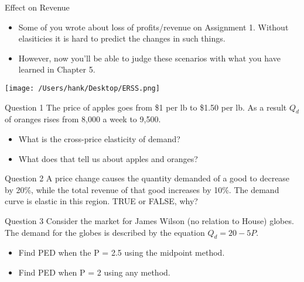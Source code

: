 \documentclass[aspectratio=169]{beamer}
\begin{document}
\begin{frame}{Effect on Revenue}
    \begin{itemize}
        \item Some of you wrote about loss of profits/revenue on Assignment 1. Without elasiticies it is hard to predict the changes in such things.
        \item However, now you'll be able to judge these scenarios with what you have learned in Chapter 5.
    \end{itemize}  
   
    \begin{center}
        \texttt{[image: /Users/hank/Desktop/ERSS.png]}
    \end{center}
\end{frame}

\begin{frame}
    \begin{block}{Question 1}
        The price of apples goes from \$1 per lb to \$1.50 per lb. As a result $Q_d$ of oranges rises from 8,000 a week to 9,500.
        \begin{itemize}
            \item What is the cross-price elasticity of demand?
            \item What does that tell us about apples and oranges?
        \end{itemize}
    \end{block}

    \begin{block}{Question 2}
        A price change causes the quantity demanded of a good to decrease by 20\%, while the total revenue of that good increases by 10\%. The demand curve is elastic in this region. TRUE or FALSE, why?  
    \end{block}

    \begin{block}{Question 3}
        Consider the market for James Wilson (no relation to House) globes. The demand for the globes is described by the equation $ Q_d = 20-5P$. 
        \begin{itemize}
            \item Find PED when the P = 2.5 using the midpoint method.
            \item Find PED when P = 2 using any method.
        \end{itemize}
    \end{block}
\end{frame}
\end{document}
